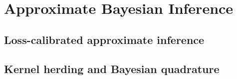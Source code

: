 \part{Approximate Bayesian Inference\label{part:2}}

\chapter{Loss-calibrated approximate inference\label{sec:approximate_inference}}


\chapter{Kernel herding and Bayesian quadrature\label{sec:herding}}
